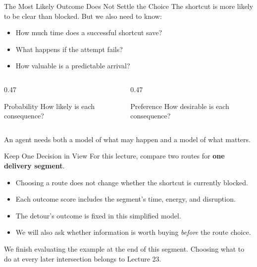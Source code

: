 \documentclass[aspectratio=169,10pt]{beamer}
\begin{document}
\begin{frame}{The Most Likely Outcome Does Not Settle the Choice}
  The shortcut is more likely to be clear than blocked. But we also need to know:
  \begin{itemize}
    \item How much time does a successful shortcut save?
    \item What happens if the attempt fails?
    \item How valuable is a predictable arrival?
  \end{itemize}
  \begin{columns}[T,onlytextwidth]
    \begin{column}{0.47\textwidth}
      \begin{block}{Probability}
        How likely is each consequence?
      \end{block}
    \end{column}
    \begin{column}{0.47\textwidth}
      \begin{block}{Preference}
        How desirable is each consequence?
      \end{block}
    \end{column}
  \end{columns}
  \begin{keyidea}
    An agent needs both a model of what may happen and a model of what matters.
  \end{keyidea}
\end{frame}

\begin{frame}{Keep One Decision in View}
  For this lecture, compare two routes for \textbf{one delivery segment}.
  \begin{itemize}
    \item Choosing a route does not change whether the shortcut is currently blocked.
    \item Each outcome score includes the segment's time, energy, and disruption.
    \item The detour's outcome is fixed in this simplified model.
    \item We will also ask whether information is worth buying \emph{before} the route choice.
  \end{itemize}
  \begin{keyidea}
    We finish evaluating the example at the end of this segment. Choosing what to do at every later intersection belongs to Lecture 23.
  \end{keyidea}
\end{frame}
\end{document}
